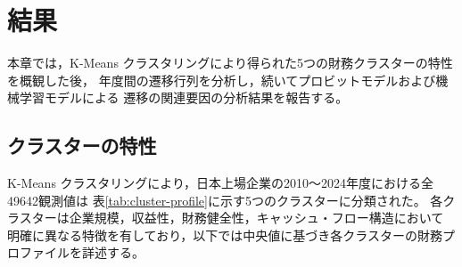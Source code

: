 \chapter{結果}
\label{chap:results}

本章では，K-Means クラスタリングにより得られた5つの財務クラスターの特性を概観した後，
年度間の遷移行列を分析し，続いてプロビットモデルおよび機械学習モデルによる
遷移の関連要因の分析結果を報告する。

\section{クラスターの特性}
\label{sec:results-clusters}

K-Means クラスタリングにより，日本上場企業の2010〜2024年度における全\num{49642}観測値は
表\ref{tab:cluster-profile}に示す5つのクラスターに分類された。
各クラスターは企業規模，収益性，財務健全性，キャッシュ・フロー構造において
明確に異なる特徴を有しており，以下では中央値に基づき各クラスターの財務プロファイルを詳述する。

